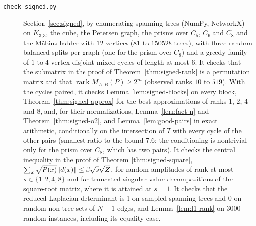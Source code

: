 \begin{description}
\item[\texttt{check\_signed.py}] Section~\ref{sec:signed}, by enumerating spanning trees (NumPy, NetworkX) on $K_{3,3}$, the cube, the Petersen graph, the prisms over $C_5$, $C_6$ and $C_8$ and the M\"obius ladder with $12$ vertices ($81$ to $150528$ trees), with three random balanced splits per graph (one for the prism over $C_8$) and a greedy family of $1$ to $4$ vertex-disjoint mixed cycles of length at most $6$. It checks that the submatrix in the proof of Theorem~\ref{thm:signed-rank} is a permutation matrix and that $\operatorname{rank}M_{A,B}(P)\ge2^m$ (observed ranks $10$ to $519$). With the cycles paired, it checks Lemma~\ref{lem:signed-blocks} on every block, Theorem~\ref{thm:signed-approx} for the best approximations of ranks $1$, $2$, $4$ and $8$, and, for their normalizations, Lemma~\ref{lem:fact-n} and Theorem~\ref{thm:signed-o2}, and Lemma~\ref{lem:good-pairs} in exact arithmetic, conditionally on the intersection of $T$ with every cycle of the other pairs (smallest ratio to the bound $7.6$; the conditioning is nontrivial only for the prism over $C_8$, which has two pairs). It checks the central inequality in the proof of Theorem~\ref{thm:signed-square}, $\sum_x\sqrt{P(x)}\lVert d(x)\rVert\le\beta\sqrt s\sqrt Z$, for random amplitudes of rank at most $s\in\{1,2,4,8\}$ and for truncated singular value decompositions of the square-root matrix, where it is attained at $s=1$. It checks that the reduced Laplacian determinant is $1$ on sampled spanning trees and $0$ on random non-tree sets of $N-1$ edges, and Lemma~\ref{lem:l1-rank} on $3000$ random instances, including its equality case.


\end{description}
